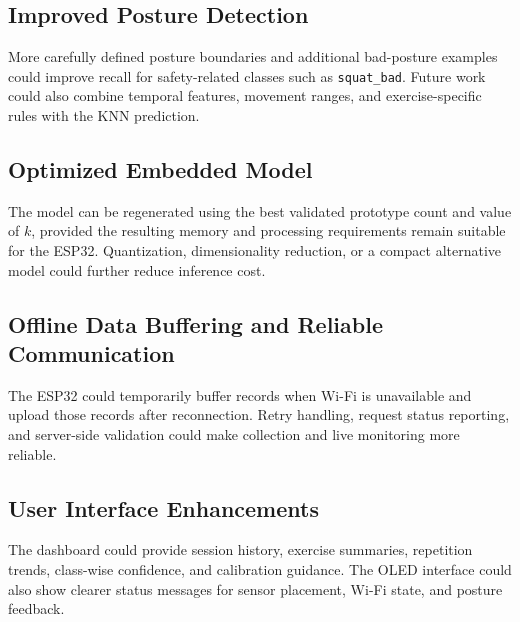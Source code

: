 \subsection{Improved Posture Detection}
More carefully defined posture boundaries and additional bad-posture examples could
improve recall for safety-related classes such as \texttt{squat\_bad}. Future work
could also combine temporal features, movement ranges, and exercise-specific rules
with the KNN prediction.

\subsection{Optimized Embedded Model}
The model can be regenerated using the best validated prototype count and value of
$k$, provided the resulting memory and processing requirements remain suitable for
the ESP32. Quantization, dimensionality reduction, or a compact alternative model
could further reduce inference cost.

\subsection{Offline Data Buffering and Reliable Communication}
The ESP32 could temporarily buffer records when Wi-Fi is unavailable and upload
those records after reconnection. Retry handling, request status reporting, and
server-side validation could make collection and live monitoring more reliable.

\subsection{User Interface Enhancements}
The dashboard could provide session history, exercise summaries, repetition trends,
class-wise confidence, and calibration guidance. The OLED interface could also show
clearer status messages for sensor placement, Wi-Fi state, and posture feedback.
